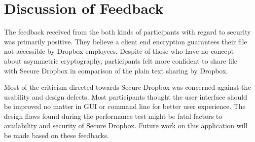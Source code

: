 \section{Discussion of Feedback}

The feedback received from the both kinds of participants with regard to security was primarily positive. They believe a client end encryption guarantees their file not accessible by Dropbox employees. Despite of those who have no concept about asymmetric cryptography, participants felt more confident to share file with Secure Dropbox in comparison of the plain text sharing by Dropbox.

Most of the criticism directed towards Secure Dropbox was concerned against the usability and design defects. Most participants thought the user interface should be improved no matter in GUI or command line for better user experience. The design flaws found during the performance test might be fatal factors to availability and security of Secure Dropbox. Future work on this application will be made based on these feedbacks.
